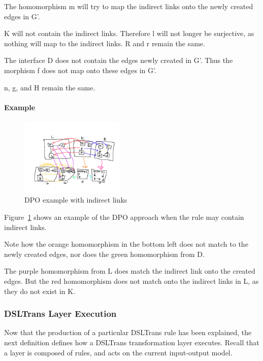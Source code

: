 The homomorphism m will try to map the indirect links onto the newly created edges in G'.

K will not contain the indirect links. Therefore l will not longer be surjective, as nothing will map to the indirect links. R and r remain the same.

The interface D does not contain the edges newly created in G'. Thus the morphism f does not map onto these edges in G'.

n, g, and H remain the same.

\paragraph{Example}


\begin{figure}[h!] \centering
\includegraphics[width=0.44\textwidth]{figures/formal/dpo_indirect_example}
	\caption{DPO example with indirect links}
	\label{fig:dpo_indirect_example}
\end{figure}

Figure~\ref{fig:dpo_indirect_example} shows an example of the DPO approach when the rule may contain indirect links.

Note how the orange homomorphism in the bottom left does not match to the newly created edges, nor does the green homomorphism from D.

The purple homomorphism from L does match the indirect link onto the created edges. But the red homomorphism does not match onto the indirect links in L, as they do not exist in K.



\subsubsection*{DSLTrans Layer Execution}

Now that the production of a particular DSLTrans rule has been explained, the next definition defines how a DSLTrans transformation layer executes. Recall that a layer is composed of rules, and acts on the current input-output model.



